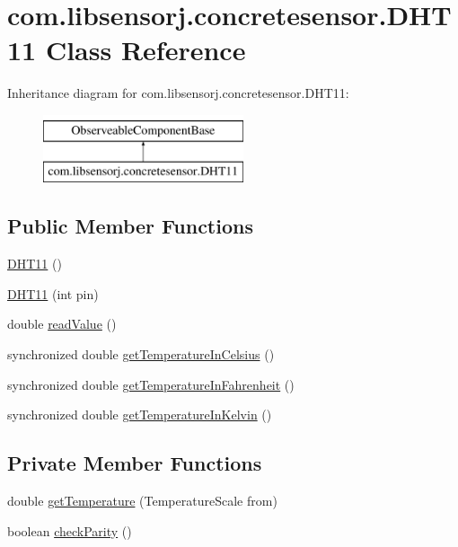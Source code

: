 \hypertarget{classcom_1_1libsensorj_1_1concretesensor_1_1DHT11}{}\section{com.\+libsensorj.\+concretesensor.\+D\+H\+T11 Class Reference}
\label{classcom_1_1libsensorj_1_1concretesensor_1_1DHT11}
Inheritance diagram for com.\+libsensorj.\+concretesensor.\+D\+H\+T11\+:\begin{figure}[H]
\begin{center}
\leavevmode
\includegraphics[height=2.000000cm]{classcom_1_1libsensorj_1_1concretesensor_1_1DHT11}
\end{center}
\end{figure}
\subsection*{Public Member Functions}
\begin{DoxyCompactItemize}
\item 
\hyperlink{classcom_1_1libsensorj_1_1concretesensor_1_1DHT11_a6dee6dabad63a5b8f8ba35f1279703c2}{D\+H\+T11} ()
\item 
\hyperlink{classcom_1_1libsensorj_1_1concretesensor_1_1DHT11_a6b867144169aa951ddbd09fc9ec5f6e5}{D\+H\+T11} (int pin)
\item 
double \hyperlink{classcom_1_1libsensorj_1_1concretesensor_1_1DHT11_a84f4c759756e582eb0e3d12675525c87}{read\+Value} ()
\item 
synchronized double \hyperlink{classcom_1_1libsensorj_1_1concretesensor_1_1DHT11_a4c88c53cbcacce861433ea2f03dd08f0}{get\+Temperature\+In\+Celsius} ()
\item 
synchronized double \hyperlink{classcom_1_1libsensorj_1_1concretesensor_1_1DHT11_a21bd2e0675b083a83610584d199c268b}{get\+Temperature\+In\+Fahrenheit} ()
\item 
synchronized double \hyperlink{classcom_1_1libsensorj_1_1concretesensor_1_1DHT11_ab2263c3d3e8deb1c1389fdb9c642b5ee}{get\+Temperature\+In\+Kelvin} ()
\end{DoxyCompactItemize}
\subsection*{Private Member Functions}
\begin{DoxyCompactItemize}
\item 
double \hyperlink{classcom_1_1libsensorj_1_1concretesensor_1_1DHT11_a1d452b9a4f3ff98d35cc425aee062bd4}{get\+Temperature} (Temperature\+Scale from)
\item 
boolean \hyperlink{classcom_1_1libsensorj_1_1concretesensor_1_1DHT11_a46fc1af81db68410209e81e5376428a9}{check\+Parity} ()
\end{DoxyCompactItemize}
